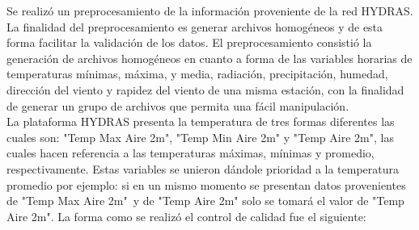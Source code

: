 Se realizó un preprocesamiento de la información proveniente de la red HYDRAS. La finalidad del preprocesamiento es generar archivos homogéneos y de esta forma facilitar la validación de los datos. El preprocesamiento consistió la generación de archivos homogéneos en cuanto a forma de las variables horarias de temperaturas mínimas, máxima, y media, radiación, precipitación, humedad, dirección del viento y rapidez del viento de una misma estación, con la finalidad de generar un grupo de archivos que permita una fácil manipulación.\\

La plataforma HYDRAS presenta la temperatura de tres formas diferentes las cuales son: "Temp Max Aire 2m", "Temp Min Aire 2m" y "Temp Aire 2m", las cuales hacen referencia a las temperaturas máximas, mínimas y promedio, respectivamente. Estas variables se unieron dándole prioridad a la temperatura promedio por ejemplo: si en un mismo momento se presentan datos provenientes de "Temp Max Aire 2m"\ y de "Temp Aire 2m" solo se tomará el valor de "Temp Aire 2m". La forma como se realizó el control de calidad fue el siguiente:


